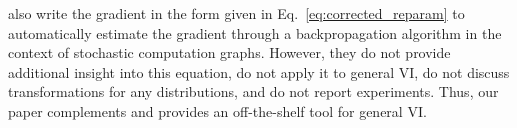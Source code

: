 \citet{Schulman2015} also write the gradient in the form given in Eq.~\ref{eq:corrected_reparam} to automatically estimate the gradient through a backpropagation algorithm in the context of stochastic computation graphs. However, they do not provide additional insight into this equation, do not apply it to general \gls{VI}, do not discuss transformations for any distributions, and do not report experiments. Thus, our paper complements \citet{Schulman2015} and provides an off-the-shelf tool for general \gls{VI}.

